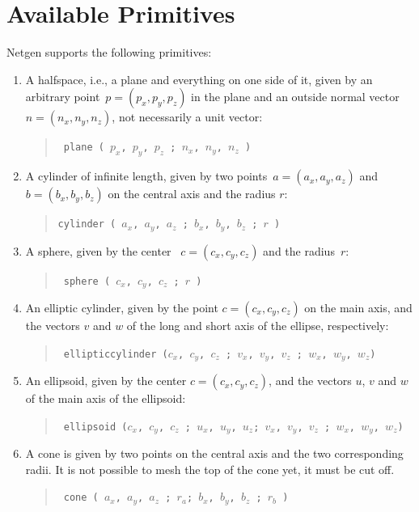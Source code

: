 \documentclass[12pt]{book}
\begin{document}
\section{Available Primitives}
\label{sec_primitives}
Netgen %
supports the following primitives:
\begin{enumerate}
\item A halfspace, i.e., a plane and everything on one side of it,
  given by an arbitrary point~$p = (p_x, p_y, p_z)$ in the plane and
  an outside normal vector~$n = (n_x, n_y, n_z)$, not necessarily a
  unit vector:
  \begin{quote}
    \tt
    plane ( $p_x$, $p_y$, $p_z$ ; $n_x$, $n_y$, $n_z$ )
  \end{quote}
  
\item 
  A cylinder of infinite length, given by two points~$a=(a_x, a_y,a_z)$
  and $b=(b_x, b_y, b_z)$ on the central axis and the radius $r$:
  \begin{quote}
    \tt cylinder ( $a_x$, $a_y$, $a_z$ ; $b_x$, $b_y$, $b_z$ ; $r$ )
  \end{quote}
  
\item 
  A sphere, given by the center~ $c=(c_x,c_y,c_z)$ and the radius~$r$:
  \begin{quote}
    \tt
    sphere ( $c_x$, $c_y$, $c_z$ ; $r$ )
  \end{quote}
 
\item
  An elliptic cylinder, given by the point $c=(c_x, c_y, c_z)$ on the main axis, 
  and the vectors $v$ and $w$ of the long and short axis of the ellipse, respectively:
  \begin{quote}
    \tt
    ellipticcylinder ($c_x$, $c_y$, $c_z$ ; $v_x$, $v_y$, $v_z$ ; $w_x$, $w_y$, $w_z$)
  \end{quote}

\item
  An ellipsoid, given by the center $c=(c_x, c_y, c_z)$,
  and the vectors $u$, $v$ and $w$ of the main axis of the ellipsoid:
  \begin{quote}
    \tt
    ellipsoid ($c_x$, $c_y$, $c_z$ ; $u_x$, $u_y$, $u_z$; $v_x$, $v_y$, $v_z$ ; $w_x$, $w_y$, $w_z$)
  \end{quote}

 
\item A cone is given by two points on the central axis and the two
  corresponding radii.  It is not possible to mesh the top of the cone
  yet, it must be cut off.
  \begin{quote}
    \tt
    cone ( $a_x$, $a_y$, $a_z$ ; $r_a$; $b_x$, $b_y$, $b_z$ ; $r_b$  )
  \end{quote}
  

\end{enumerate}
\end{document}
